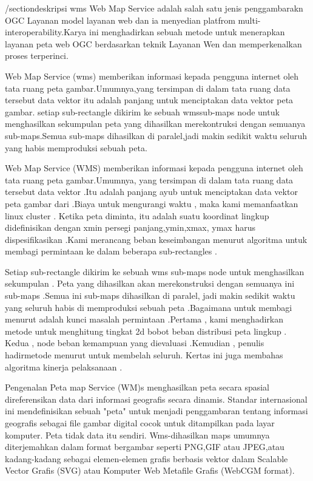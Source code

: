 
/section{deskripsi wms}
  Web Map Service adalah salah satu jenis penggambarakn OGC Layanan model layanan web dan ia menyedian platfrom
multi-interoperability.Karya ini menghadirkan sebuah metode untuk menerapkan layanan peta web OGC berdasarkan teknik
Layanan Wen dan memperkenalkan proses terperinci.
  
    Web Map Service (wms) memberikan informasi kepada pengguna internet oleh tata ruang peta gambar.Umumnya,yang tersimpan
di dalam tata ruang data tersebut data vektor itu adalah panjang untuk menciptakan data vektor peta gambar.
setiap sub-rectangle dikirim ke sebuah wmssub-maps node untuk menghasilkan sekumpulan peta yang dihasilkan merekontruksi
dengan semuanya sub-maps.Semua sub-maps dihasilkan di paralel,jadi makin sedikit waktu seluruh yang habis memproduksi
sebuah peta.

   Web Map Service (WMS) memberikan informasi kepada pengguna internet oleh tata ruang peta gambar.Umumnya,
yang tersimpan di dalam tata ruang data tersebut data vektor .Itu adalah panjang ayub untuk 
menciptakan data vektor peta gambar dari .Biaya untuk mengurangi waktu , maka kami memanfaatkan linux cluster .
Ketika peta diminta, itu adalah suatu koordinat lingkup didefinisikan dengan xmin persegi panjang,ymin,xmax, 
ymax harus dispesifikasikan .Kami merancang beban keseimbangan menurut algoritma untuk membagi permintaan ke dalam 
beberapa sub-rectangles .

   Setiap sub-rectangle dikirim ke sebuah wms sub-maps node untuk menghasilkan sekumpulan .
Peta yang dihasilkan akan merekonstruksi dengan semuanya ini sub-maps .Semua ini sub-maps dihasilkan di paralel, 
jadi makin sedikit waktu yang seluruh habis di memproduksi sebuah peta .Bagaimana untuk membagi menurut adalah 
kunci masalah permintaan .Pertama , kami menghadirkan metode untuk menghitung tingkat 2d bobot beban distribusi peta lingkup .
Kedua , node beban kemampuan yang dievaluasi .Kemudian , penulis hadirmetode menurut untuk membelah seluruh.
Kertas ini juga membahas algoritma kinerja pelaksanaan .

   Pengenalan Peta map Service (WM)s menghasilkan peta secara spasial direferensikan data dari informasi geografis secara dinamis. 
Standar internasional ini mendefinisikan sebuah "peta" untuk menjadi penggambaran tentang informasi geografis 
sebagai file gambar digital cocok untuk ditampilkan pada layar komputer. Peta tidak data itu sendiri. 
Wms-dihasilkan maps umumnya diterjemahkan dalam format bergambar seperti PNG,GIF atau JPEG,atau kadang-kadang sebagai
elemen-elemen grafis berbasis vektor dalam Scalable Vector Grafis (SVG) atau Komputer Web Metafile Grafis (WebCGM format).

